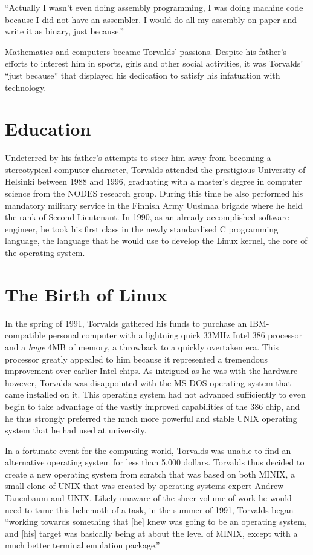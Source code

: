 \documentclass{article}
\begin{document}
``Actually I wasn't even doing assembly programming, I was doing machine code because I did not have an assembler.  I would do all my assembly on paper and write it as binary, just because.''\cite{interview} \newline \newline

Mathematics and computers became Torvalds' passions. Despite his father's efforts to interest him in sports, girls and other social activities, it was Torvalds' ``just because'' that displayed his dedication to satisfy his infatuation with technology. 

\section{Education}Undeterred by his father’s attempts to steer him away from becoming a stereotypical computer character, Torvalds attended the prestigious University of Helsinki between 1988 and 1996, graduating with a master's degree in computer science from the NODES research group.  During this time he also performed his mandatory military service in the Finnish Army Uusimaa brigade where he held the rank of Second Lieutenant. In 1990, as an already accomplished software engineer, he took his first class in the newly standardised C programming language, the language that he would use to develop the Linux kernel, the core of the operating system.

\section{The Birth of Linux} In the spring of 1991, Torvalds gathered his funds to purchase an IBM-compatible personal computer with a lightning quick 33MHz Intel 386 processor and a {\em huge} 4MB of memory, a throwback to a quickly overtaken era.  This processor greatly appealed to him because it represented a tremendous improvement over earlier Intel chips. As intrigued as he was with the hardware however, Torvalds was disappointed with the MS-DOS operating system that came installed on it. This operating system had not advanced sufficiently to even begin to take advantage of the vastly improved capabilities of the 386 chip, and he thus strongly preferred the much more powerful and stable UNIX operating system that he had used at university. \newline \newline

In a fortunate event for the computing world, Torvalds was unable to find an alternative operating system for less than 5,000 dollars. Torvalds thus decided to create a new operating system from scratch that was based on both MINIX, a small clone of UNIX that was created by operating systems expert Andrew Tanenbaum and UNIX. Likely unaware of the sheer volume of work he would need to tame this behemoth of a task, in the summer of 1991, Torvalds began ``working towards something that [he] knew was going to be an operating system, and [his] target was basically being at about the level of MINIX, except with a much better terminal emulation package.''\cite{interview} \newline \newline
\end{document}
